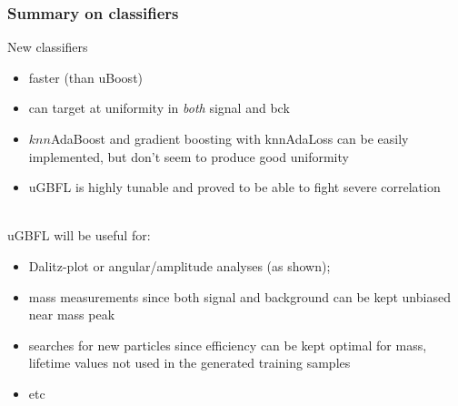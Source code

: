 \documentclass{beamer}
\begin{document}





\begin{frame}[t]
    \frametitle{Summary on classifiers}
    \small
    New classifiers
    \begin{itemize}
        \item faster (than uBoost)
        \item can target at uniformity in \textit{both} signal and bck
        \item $knn$AdaBoost and gradient boosting with knnAdaLoss can be easily implemented, but don't seem to produce good uniformity
        \item uGBFL is highly tunable and proved to be able to fight severe correlation
    \end{itemize}
    $ $ \\
    uGBFL will be useful for:  
    \begin{itemize}
        \item Dalitz-plot or angular/amplitude analyses (as shown);
        \item mass measurements since both signal and background can be kept unbiased near mass peak
        \item searches for new particles since efficiency can be kept optimal for mass, lifetime values not used in the generated training samples
        \item etc
    \end{itemize}
\end{frame}
\end{document}
